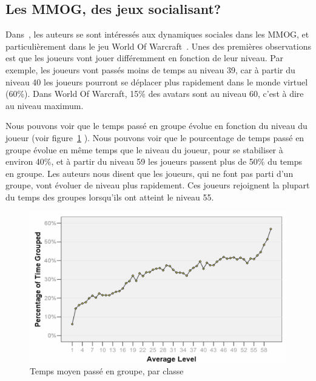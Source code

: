 \subsection{Les MMOG, des jeux socialisant?}
\par Dans~\cite{1124834}, les auteurs se sont intéressés aux dynamiques sociales dans les MMOG, et particulièrement dans le jeu World Of Warcraft~\cite{wow}. Unes des premières observations est que les joueurs vont jouer différemment en fonction de leur niveau. Par exemple, les joueurs vont passés moins de temps au niveau 39, car à partir du niveau 40 les joueurs pourront se déplacer plus rapidement dans le monde virtuel (60\%). Dans World Of Warcraft, 15\% des avatars sont au niveau 60, c'est à dire au niveau maximum.

\par Nous pouvons voir que le temps passé en groupe évolue en fonction du niveau du joueur (voir figure~\ref{timespentgroup} ). Nous pouvons voir que le pourcentage de temps passé en groupe évolue en même temps que le niveau du joueur, pour se stabiliser à environ 40\%, et à partir du niveau 59 les joueurs passent plus de 50\% du temps en groupe. Les auteurs nous disent que les joueurs, qui ne font pas parti d'un groupe, vont évoluer de niveau plus rapidement. Ces joueurs rejoignent la plupart du temps des groupes lorsqu'ils ont atteint le niveau 55. 
	\begin{figure}[!h]
        \centering
        \includegraphics[scale=0.95]{./Ressources/Images/timespentgroup.png}
        \caption{Temps moyen passé en groupe, par classe}
        \label{timespentgroup}
        \end{figure}

